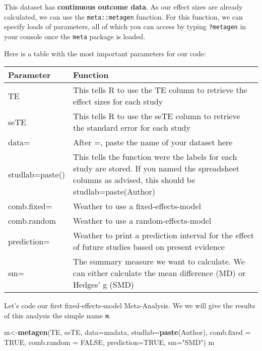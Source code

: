 \documentclass[]{book}
\newenvironment{Shaded}{\begin{snugshade}}{\end{snugshade}}
\newcommand{\KeywordTok}[1]{\textcolor[rgb]{0.13,0.29,0.53}{\textbf{#1}}}
\newcommand{\DataTypeTok}[1]{\textcolor[rgb]{0.13,0.29,0.53}{#1}}
\newcommand{\StringTok}[1]{\textcolor[rgb]{0.31,0.60,0.02}{#1}}
\newcommand{\OtherTok}[1]{\textcolor[rgb]{0.56,0.35,0.01}{#1}}
\newcommand{\NormalTok}[1]{#1}
\theoremstyle{definition}
\theoremstyle{definition}
\theoremstyle{definition}
\theoremstyle{remark}
\begin{document}
This dataset has \textbf{continuous outcome data}. As our effect sizes
are already calculated, we can use the \texttt{meta::metagen} function.
For this function, we can specify loads of parameters, all of which you
can access by typing \texttt{?metagen} in your console once the
\texttt{meta} package is loaded.

Here is a table with the most important parameters for our code:

\begin{tabular}{l|l}
\hline
Parameter & Function\\
\hline
TE & This tells R to use the TE column to retrieve the effect sizes for each study\\
\hline
seTE & This tells R to use the seTE column to retrieve the standard error for each             study\\
\hline
data= & After =, paste the name of your dataset here\\
\hline
studlab=paste() & This tells the function were the labels for each study are stored. If you named the spreadsheet columns as advised, this should be studlab=paste(Author)\\
\hline
comb.fixed= & Weather to use a fixed-effects-model\\
\hline
comb.random & Weather to use a random-effects-model\\
\hline
prediction= & Weather to print a prediction interval for the effect of future studies based on present evidence\\
\hline
sm= & The summary measure we want to calculate. We can either calculate the mean difference (MD) or Hedges' g (SMD)\\
\hline
\end{tabular}

Let's code our first fixed-effects-model Meta-Analysis. We we will give
the results of this analysis the simple name \texttt{m}.

\begin{Shaded}
\begin{Highlighting}[]
\NormalTok{m<-}\KeywordTok{metagen}\NormalTok{(TE,}
\NormalTok{        seTE,}
        \DataTypeTok{data=}\NormalTok{madata,}
        \DataTypeTok{studlab=}\KeywordTok{paste}\NormalTok{(Author),}
        \DataTypeTok{comb.fixed =} \OtherTok{TRUE}\NormalTok{,}
        \DataTypeTok{comb.random =} \OtherTok{FALSE}\NormalTok{,}
        \DataTypeTok{prediction=}\OtherTok{TRUE}\NormalTok{,}
        \DataTypeTok{sm=}\StringTok{"SMD"}\NormalTok{)}
\NormalTok{m}
\end{Highlighting}
\end{Shaded}
\end{document}
